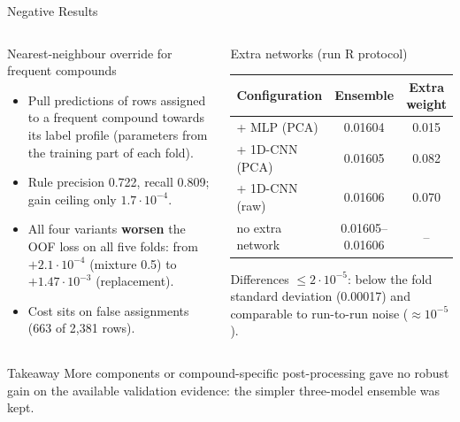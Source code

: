 \documentclass[aspectratio=169,10pt]{beamer}
\begin{document}
\begin{frame}{Negative Results}
\small
\begin{columns}[T,onlytextwidth]
\begin{block}{Nearest-neighbour override for frequent compounds}
\begin{itemize}
  \item Pull predictions of rows assigned to a frequent compound towards its label profile (parameters from the training part of each fold).
  \item Rule precision 0.722, recall 0.809; gain ceiling only $1.7\cdot10^{-4}$.
  \item All four variants \textbf{worsen} the OOF loss on all five folds: from $+2.1\cdot10^{-4}$ (mixture 0.5) to $+1.47\cdot10^{-3}$ (replacement).
  \item Cost sits on false assignments (663 of 2,381 rows).
\end{itemize}
\end{block}
\begin{block}{Extra networks (run R protocol)}
\scriptsize
\begin{tabular}{lcc}
\toprule
\textbf{Configuration} & \textbf{Ensemble} & \textbf{Extra weight}\\
\midrule
+ MLP (PCA) & 0.01604 & 0.015\\
+ 1D-CNN (PCA) & 0.01605 & 0.082\\
+ 1D-CNN (raw) & 0.01606 & 0.070\\
no extra network & 0.01605--0.01606 & --\\
\bottomrule
\end{tabular}
\vspace{0.3em}
\small
Differences $\le 2\cdot10^{-5}$: below the fold standard deviation (0.00017) and comparable to run-to-run noise ($\approx10^{-5}$).
\end{block}
\end{columns}
\vspace{0.4em}
\begin{alertblock}{Takeaway}
More components or compound-specific post-processing gave no robust gain on the available validation evidence: the simpler three-model ensemble was kept.
\end{alertblock}
\end{frame}
\end{document}
